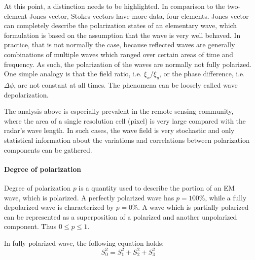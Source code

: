 
At this point, a distinction needs to be highlighted. %
In comparison to the two-element Jones vector, Stokes vectors have more data, four elements. 
Jones vector can completely describe the polarization states of an elementary wave, which formulation is based on the assumption that the wave is very well behaved.
In practice, that is not normally the case, because reflected waves are generally combinations of multiple waves which ranged over certain areas of time and frequency. 
As such, the polarization of the waves are normally not fully polarized.
One simple analogy is that the field ratio, i.e. $\xi_x/\xi_y$, or the phase difference, i.e. $\Delta \phi$, are not constant at all times.
The phenomena can be loosely called wave depolarization.

The analysis above is especially prevalent in the remote sensing community, where the area of a single resolution cell (pixel) is very large compared with the radar's wave length.
In such cases, the wave field is very stochastic and only statistical information about the variations and correlations between polarization components can be gathered. 

\paragraph{Degree of polarization}

Degree of polarization $p$ is a quantity used to describe the portion of an EM wave, which is polarized.
A perfectly polarized wave has $p=100\%$, while a fully depolarized wave is characterized by $p=0\%$.
A wave which is partially polarized can be represented as a superposition of a polarized and another unpolarized component.
Thus $0 \leq p \leq 1$.

In fully polarized wave, the following equation holds:
\begin{equation}
S_0^2 = S_1^2 + S_2^2 + S_3^2
\end{equation}

